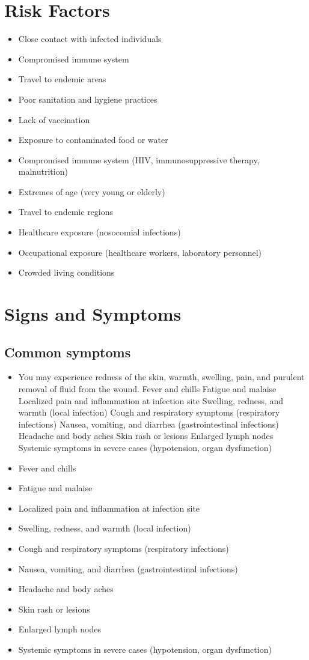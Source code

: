 \section{Risk Factors}


\begin{itemize}[noitemsep]
  \item Close contact with infected individuals
  \item Compromised immune system
  \item Travel to endemic areas
  \item Poor sanitation and hygiene practices
  \item Lack of vaccination
  \item Exposure to contaminated food or water
  \item Compromised immune system (HIV, immunosuppressive therapy, malnutrition)
  \item Extremes of age (very young or elderly)
  \item Travel to endemic regions
  \item Healthcare exposure (nosocomial infections)
  \item Occupational exposure (healthcare workers, laboratory personnel)
  \item Crowded living conditions
\end{itemize}
\section{Signs and Symptoms}

\subsection{Common symptoms}
\begin{itemize}[noitemsep]
  \item You may experience redness of the skin, warmth, swelling, pain, and purulent removal of fluid from the wound. Fever and chills Fatigue and malaise Localized pain and inflammation at infection site Swelling, redness, and warmth (local infection) Cough and respiratory symptoms (respiratory infections) Nausea, vomiting, and diarrhea (gastrointestinal infections) Headache and body aches Skin rash or lesions Enlarged lymph nodes Systemic symptoms in severe cases (hypotension, organ dysfunction)
  \item Fever and chills
  \item Fatigue and malaise
  \item Localized pain and inflammation at infection site
  \item Swelling, redness, and warmth (local infection)
  \item Cough and respiratory symptoms (respiratory infections)
  \item Nausea, vomiting, and diarrhea (gastrointestinal infections)
  \item Headache and body aches
  \item Skin rash or lesions
  \item Enlarged lymph nodes
  \item Systemic symptoms in severe cases (hypotension, organ dysfunction)
\end{itemize}

